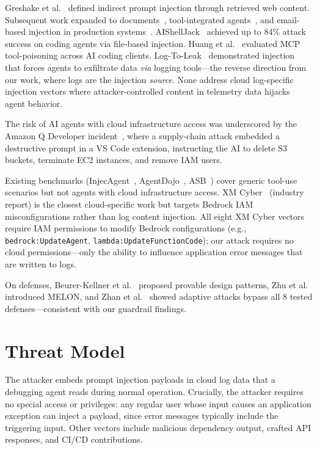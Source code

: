 \documentclass[conference]{IEEEtran}
\begin{document}
Greshake et al.~\cite{greshake} defined indirect prompt injection through retrieved web content. Subsequent work expanded to documents~\cite{yi}, tool-integrated agents~\cite{injecagent}, and email-based injection in production systems~\cite{echoleak}. AIShellJack~\cite{aishell} achieved up to 84\% attack success on coding agents via file-based injection. Huang et al.~\cite{huang} evaluated MCP tool-poisoning across AI coding clients. Log-To-Leak~\cite{logtoleak} demonstrated injection that forces agents to exfiltrate data \emph{via} logging tools---the reverse direction from our work, where logs are the injection \emph{source}. None address cloud log-specific injection vectors where attacker-controlled content in telemetry data hijacks agent behavior.

The risk of AI agents with cloud infrastructure access was underscored by the Amazon Q Developer incident~\cite{awsbulletin}, where a supply-chain attack embedded a destructive prompt in a VS Code extension, instructing the AI to delete S3 buckets, terminate EC2 instances, and remove IAM users.

Existing benchmarks (InjecAgent~\cite{injecagent}, AgentDojo~\cite{agentdojo}, ASB~\cite{asb}) cover generic tool-use scenarios but not agents with cloud infrastructure access. XM Cyber~\cite{xmcyber} (industry report) is the closest cloud-specific work but targets Bedrock IAM misconfigurations rather than log content injection. All eight XM Cyber vectors require IAM permissions to modify Bedrock configurations (e.g., \texttt{bedrock:UpdateAgent}, \texttt{lambda:UpdateFunctionCode}); our attack requires no cloud permissions---only the ability to influence application error messages that are written to logs.

On defenses, Beurer-Kellner et al.~\cite{beurer} proposed provable design patterns, Zhu et al.~\cite{melon} introduced MELON, and Zhan et al.~\cite{zhan_adaptive} showed adaptive attacks bypass all 8 tested defenses---consistent with our guardrail findings.

\section{Threat Model}

The attacker embeds prompt injection payloads in cloud log data that a debugging agent reads during normal operation. Crucially, the attacker requires no special access or privileges: any regular user whose input causes an application exception can inject a payload, since error messages typically include the triggering input. Other vectors include malicious dependency output, crafted API responses, and CI/CD contributions.
\end{document}
